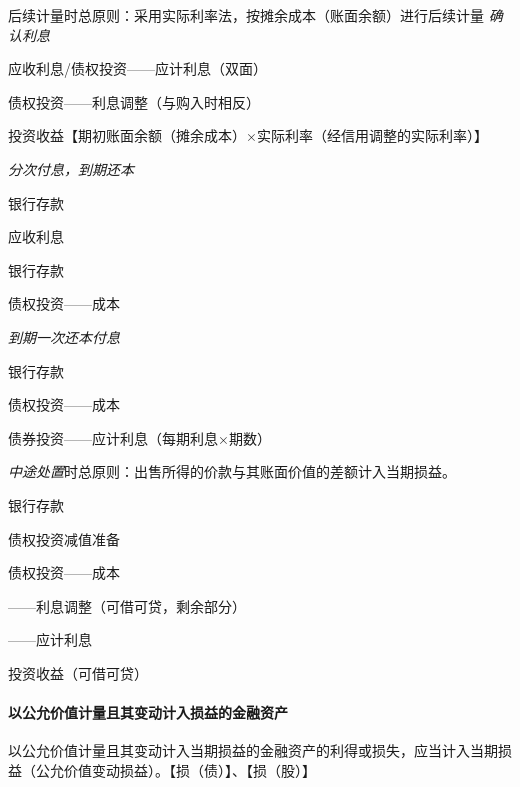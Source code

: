 \documentclass[UTF8,12pt]{ctexart}
\newenvironment{Dr}{%
	\begin{list}{}%
		{
			\setlength{\leftmargin}{2em}
			\setlength{\labelwidth}{2em}
			\setlength{\labelsep}{0pt}
			\setlength{\itemindent}{0pt}
			\setlength{\listparindent}{0pt}
			\setlength{\parsep}{0pt}
			\setlength{\topsep}{0pt}
		}
		\item[\textbf{借：}]
	}{%
	\end{list}
}
\newenvironment{Cr}{%
	\begin{list}{}%
		{
			\setlength{\leftmargin}{3em}
			\setlength{\labelwidth}{2em}
			\setlength{\labelsep}{0pt}
			\setlength{\itemindent}{0pt}
			\setlength{\listparindent}{0pt}
			\setlength{\parsep}{0pt}
			\setlength{\topsep}{0pt}
		}
		\item[\textbf{贷：}]
	}{%
	\end{list}
}
\numberwithin{equation}{section} %
\numberwithin{figure}{section}
\numberwithin{table}{section}
\begin{document}
	后续计量时总原则：采用实际利率法，按摊余成本（账面余额）进行后续计量
	\textit{确认利息}
	
	\begin{Dr}
		应收利息/债权投资——应计利息（双面）
		
		债权投资——利息调整（与购入时相反）
	\end{Dr}
	\begin{Cr}
		投资收益【期初账面余额（摊余成本）×实际利率（经信用调整的实际利率）】
	\end{Cr}

	\textit{分次付息，到期还本}
	
	\begin{Dr}
		银行存款
	\end{Dr}
	\begin{Cr}
		应收利息
	\end{Cr}
	\begin{Dr}
		银行存款
	\end{Dr}
	\begin{Cr}
		债权投资——成本
	\end{Cr}

	\textit{到期一次还本付息}
	
	\begin{Dr}
		银行存款
	\end{Dr}
	\begin{Cr}
		债权投资——成本
		
		债券投资——应计利息（每期利息×期数）
	\end{Cr}
	
	\textit{中途处置}时总原则：出售所得的价款与其账面价值的差额计入当期损益。
	
	\begin{Dr}
		银行存款
		
		债权投资减值准备
	\end{Dr}
	\begin{Cr}
		债权投资——成本
		
		——利息调整（可借可贷，剩余部分）
		
		——应计利息
		
		投资收益（可借可贷）
	\end{Cr}

	
	
	
	\paragraph{以公允价值计量且其变动计入损益的金融资产}
	以公允价值计量且其变动计入当期损益的金融资产的利得或损失，应当计入当期损益（公允价值变动损益）。【损（债）】、【损（股）】
	
\end{document}
